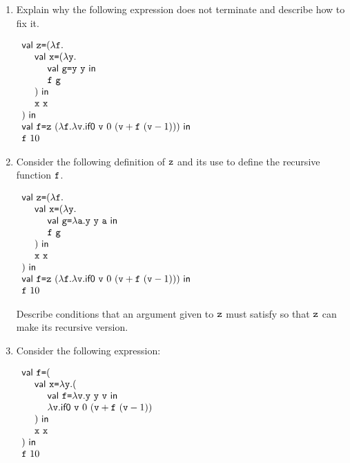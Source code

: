 \begin{enumerate}
\item Explain why the following expression does not terminate and describe how
  to fix it.

$\begin{array}{l}
  \ebind{\cz}{(\efun{\cf}{\\
  \ \ \ \ \ebind{\cx}{(\efun{\cy}{\\
  \ \ \ \ \ \ \ \ \ebind{\code{g}}{\eapp{\cy}{\cy}}{\\
  \ \ \ \ \ \ \ \ \eapp{\cf}{\code{g}}}}\\
  \ \ \ \ )}{\\
  \ \ \ \ \eapp{\cx}{\cx}}}\\
  )}{\\
  \ebind{\cf}{\eapp{\cz}{(\efun{\cf}{\efun{\cv}{\sumbodyfv}})}}{\\
  \eapp{\cf}{10}
  }
}
\end{array}$

\item Consider the following definition of $\cz$ and its use to define the recursive
function $\cf$.

$\begin{array}{l}
  \ebind{\cz}{(\efun{\cf}{\\
  \ \ \ \ \ebind{\cx}{(\efun{\cy}{\\
  \ \ \ \ \ \ \ \ \ebind{\code{g}}{\efun{\code{a}}{\eapp{\eapp{\cy}{\cy}}{\code{a}}}}{\\
  \ \ \ \ \ \ \ \ \eapp{\cf}{\code{g}}}}\\
  \ \ \ \ )}{\\
  \ \ \ \ \eapp{\cx}{\cx}}}\\
  )}{\\
  \ebind{\cf}{\eapp{\cz}{(\efun{\cf}{\efun{\cv}{\sumbodyfv}})}}{\\
  \eapp{\cf}{10}
  }
}
\end{array}$

Describe conditions that an argument given to $\cz$ must satisfy so that $\cz$
    can make its recursive version.

\item Consider the following expression:

$\begin{array}{l}
  \ebind{\cf}{(\\
  \ \ \ \ \ebind{\cx}{\efun{\cy}{(\\
  \ \ \ \ \ \ \ \ \ebind{\cf}{\efun{\cv}{\eapp{\eapp{\cy}{\cy}}{\cv}}}{\\
  \ \ \ \ \ \ \ \ \efun{\cv}{\sumbodyfv}}\\
  \ \ \ \ )}}{\\
  \ \ \ \ \eapp{\cx}{\cx}\\
  )}}{\\
  \eapp{\cf}{10}
  }
\end{array}$


\end{enumerate}
